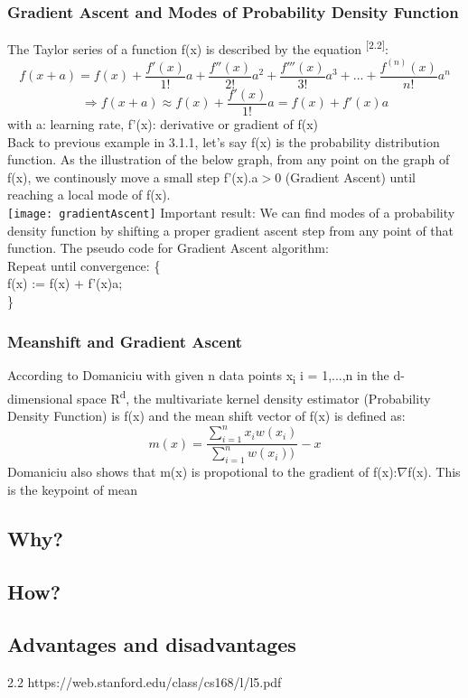 \subsubsection{Gradient Ascent and Modes of Probability Density Function}
The Taylor series of a function f(x) is described by the equation \textsuperscript{[2.2]}:
\[
    f(x+a) = f(x) + \frac{f'(x)}{1!}a+\frac{f''(x)}{2!}a^2+\frac{f'''(x)}{3!}a^3+...+\frac{f^{(n)}(x)}{n!}a^n
\]
\[\Longrightarrow f(x+a) \approx f(x) + \frac{f'(x)}{1!}a =  f(x) + f'(x)a\]
with a: learning rate,  f'(x): derivative or gradient of f(x)\\
Back to previous example in 3.1.1, let's say f(x) is the probability distribution function. As the illustration of the below graph, from any point on the graph of f(x), we continously move a small step f'(x).a$>$0 (Gradient Ascent) until reaching a local mode of f(x).\\ 
\texttt{[image: gradientAscent]}
Important result: We can find modes of a probability density function by shifting a proper gradient ascent step from any point of that function.
The pseudo code for Gradient Ascent algorithm:\\
Repeat until convergence: \{\\
f(x) := f(x) + f'(x)a;\\
\}
\subsubsection{Meanshift and Gradient Ascent}

According to Domaniciu with given n data points x\textsubscript{i} i = 1,...,n in the d-dimensional space R\textsuperscript{d}, the multivariate kernel density estimator (Probability Density Function) is f(x) and the mean shift vector of f(x) is defined as:
	\[m(x) = \frac{\sum_{i=1}^{n}x_i{w(x_i) }}{\sum_{i=1}^{n}{w(x_i) }) }-x\]
Domaniciu also shows that m(x) is propotional to the gradient of f(x):$\nabla$f(x). This is the keypoint of mean
\subsection{Why?}

\subsection{How?}

\subsection{Advantages and disadvantages}

2.2 https://web.stanford.edu/class/cs168/l/l5.pdf